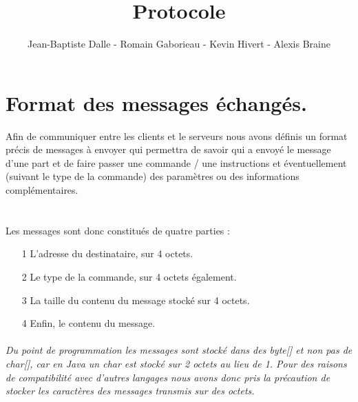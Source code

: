 \documentclass[a4paper,10pt]{article}
\title{Protocole}
\author{Jean-Baptiste Dalle - Romain Gaborieau - Kevin Hivert - Alexis Braine}
\date{}
\begin{document}
\maketitle
{}


\section{Format des messages échangés.}
Afin de communiquer entre les clients et le serveurs nous avons définis un format précis de messages à envoyer qui permettra de savoir qui a envoyé le message d'une part et de faire passer une commande / une instructions et éventuellement (suivant le type de la commande) des paramètres ou des informations complémentaires. \\ \\


\paragraph{}Les messages sont donc constitués de quatre parties : 
\begin{itemize}
\item[1] L'adresse du destinataire, sur 4 octets.
\item[2] Le type de la commande, sur 4 octets également.
\item[3] La taille du contenu du message stocké sur 4 octets.
\item[4] Enfin, le contenu du message.
\end{itemize}


\paragraph{}\textit{Du point de programmation les messages sont stocké dans des byte[] et non pas de char[], car en Java un char est stocké sur 2 octets au lieu de 1. Pour des raisons de compatibilité avec d'autres langages nous avons donc pris la précaution de stocker les caractères des messages transmis sur des octets.}
\end{document}
